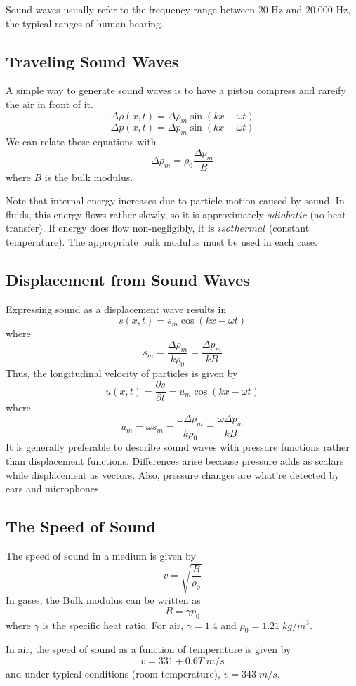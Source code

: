 \documentclass[../PhysicsFormulae.tex]{subfiles}
\begin{document}
Sound waves usually refer to the frequency range between 20 Hz and 20,000 Hz, the typical ranges of human hearing. 

\subsection{Traveling Sound Waves}
A simple way to generate sound waves is to have a piston compress and rareify the air in front of it. 
\[ \Delta \rho (x,t) = \Delta \rho_m \sin(kx - \omega t) \]
\[ \Delta p (x,t) = \Delta p_m \sin(kx - \omega t) \]
We can relate these equations with 
\[ \Delta \rho_m = \rho_0 \frac{\Delta p_m}{B} \]
where $B$ is the bulk modulus. \bigskip

Note that internal energy increases due to particle motion caused by sound. In fluids, this energy flows rather slowly, so it is approximately $adiabatic$ (no heat transfer). If energy does flow non-negligibly, it is $isothermal$ (constant temperature). The appropriate bulk modulus must be used in each case. 

\subsection{Displacement from Sound Waves}
Expressing sound as a displacement wave results in 
\[ s(x,t) = s_m \cos(kx - \omega t) \]
where 
\[ s_m = \frac{\Delta \rho_m}{k \rho_0} = \frac{\Delta p_m}{kB} \]
Thus, the longitudinal velocity of particles is given by 
\[ u(x,t) = \frac{\partial s}{\partial t} = u_m \cos(kx - \omega t) \]
where
\[ u_m = \omega s_m = \frac{\omega \Delta \rho_m}{k\rho_0} = \frac{\omega \Delta p_m}{kB} \]
It is generally preferable to describe sound waves with pressure functions rather than displacement functions. Differences arise because pressure adds as scalars while displacement as vectors. Also, pressure changes are what're detected by ears and microphones. 

\subsection{The Speed of Sound}
The speed of sound in a medium is given by 
\[ v = \sqrt{\frac{B}{\rho_0}} \]
In gases, the Bulk modulus can be written as 
\[ B = \gamma p_0 \]
where $\gamma$ is the specific heat ratio. For air, $\gamma = 1.4$ and $\rho_0 = 1.21 \; kg/m^3$. \bigskip

In air, the speed of sound as a function of temperature is given by
\[ v = 331 + 0.6T \; m/s \] 
and under typical conditions (room temperature), $v = 343 \; m/s$. 
\end{document}
